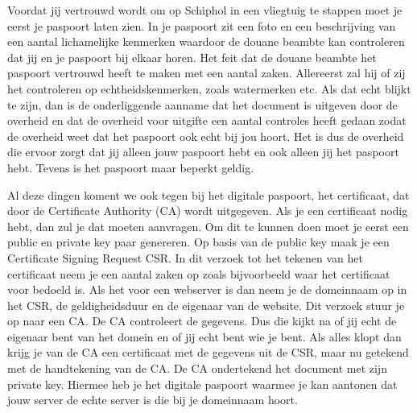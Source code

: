 Voordat jij vertrouwd wordt om op Schiphol in een vliegtuig te stappen moet je eerst je paspoort laten zien. In je paspoort zit een foto en een beschrijving van een aantal lichamelijke kenmerken waardoor de douane beambte kan controleren dat jij en je paspoort bij elkaar horen. Het feit dat de douane beambte het paspoort vertrouwd heeft te maken met een aantal zaken. Allereerst zal hij of zij het controleren op echtheidskenmerken, zoals watermerken etc. Als dat echt blijkt te zijn, dan is de onderliggende aanname dat het document is uitgeven door de overheid en dat de overheid voor uitgifte een aantal controles heeft gedaan zodat de overheid weet dat het paspoort ook echt bij jou hoort. Het is dus de overheid die ervoor zorgt dat jij alleen jouw paspoort hebt en ook alleen jij het paspoort hebt. Tevens is het paspoort maar beperkt geldig.

Al deze dingen koment we ook tegen bij het digitale paspoort, het certificaat, dat door de Certificate Authority (CA) wordt uitgegeven. Als je een certificaat nodig hebt, dan zul je dat moeten aanvragen. Om dit te kunnen doen moet je eerst een public en private key paar genereren. Op basis van de public key maak je een Certificate Signing Request CSR. In dit verzoek tot het tekenen van het certificaat neem je een aantal zaken op zoals bijvoorbeeld waar het certificaat voor bedoeld is. Als het voor een webserver is dan neem je de domeinnaam op in het CSR, de geldigheidsduur en de eigenaar van de website. Dit verzoek stuur je op naar een CA. De CA controleert de gegevens. Dus die kijkt na of jij echt de eigenaar bent van het domein en of jij echt bent wie je bent. Als alles klopt dan krijg je van de CA een certificaat met de gegevens uit de CSR, maar nu getekend met de handtekening van de CA. De CA ondertekend het document met zijn private key. Hiermee heb je het digitale paspoort waarmee je kan aantonen dat jouw server de echte server is die bij je domeinnaam hoort.


